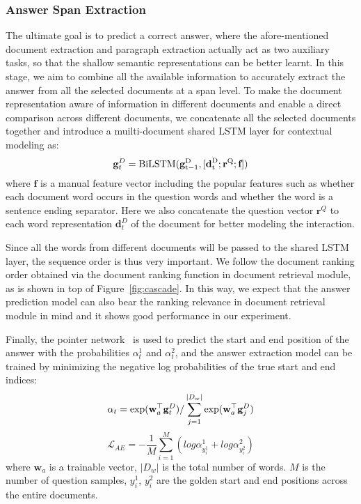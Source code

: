 \documentclass[letterpaper]{article} \usepackage{aaai19}  \usepackage{graphicx}
\begin{document}
\subsubsection{Answer Span Extraction}
The ultimate goal is to predict a correct answer, where the afore-mentioned document extraction and paragraph extraction actually act as two auxiliary tasks, so that the shallow semantic representations can be better learnt. In this stage, we aim to combine all the available information to accurately extract the answer from all the selected documents at a span level. To make the document representation aware of information in different documents and enable a direct comparison across different documents, we concatenate all the selected documents together and introduce a muilti-document shared LSTM layer for contextual modeling as:
\begin{equation} \label{equ:12}
\textbf{g}_t^D=\rm{BiLSTM}(\textbf{g}_{t-1}^D, [{\textbf{d}_t^D};{\textbf{r}^Q};\textbf{f}])
\end{equation}
where $\textbf{f}$ is a manual feature vector including the popular features such as whether each document word occurs in the question words and whether the word is a sentence ending separator. Here we also concatenate the question vector  $\textbf{r}^Q$ to each word representation $\textbf{d}_t^D$ of the document for better modeling the interaction. 

Since all the words from different documents will be passed to the shared LSTM layer, the sequence order is thus very important. We follow the document ranking order obtained via the document ranking function in document retrieval module, as is shown in top of Figure~\ref{fig:cascade}. In this way, we expect that the answer prediction model can also bear the ranking relevance in document retrieval module in mind and it shows good performance in our experiment. 

Finally, the pointer network~\cite{wang2016machine} is used to predict the start and end position of the answer with the probabilities $\alpha_t^1$ and $\alpha_t^2$,
and the answer extraction model can be trained by minimizing the negative log probabilities of the true start and end indices:
\begin{equation} \label{equ:12_1}
\alpha_t={\rm exp}(\textbf{w}_a^\top \textbf{g}_t^D)/\sum_{j=1}^{|D_w|}{\rm exp}(\textbf{w}_a^\top \textbf{g}_j^D)
\end{equation}
\begin{equation} \label{equ:13}
\mathcal{L}_{AE}=-\frac{1}{M}\sum_{i=1}^{M}(log\alpha^1_{y^1_i}+log\alpha^2_{y^2_i})
\end{equation}
where $\textbf{w}_a$ is a trainable vector, $|D_w|$ is the total number of words. $M$ is the number of question samples, $y^1_i$, $y^2_i$ are the golden start and end positions across the entire documents. 
\end{document}
